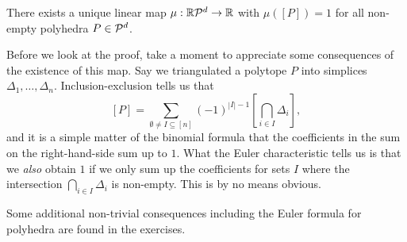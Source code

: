 \begin{lemma}
  \label{lemma:euler-characteristic}
  There exists a unique linear map $\mu: \mathbb{R}\mathcal{P}^d \to \mathbb{R}$
  with $\mu([P]) = 1$ for all non-empty polyhedra $P \in \mathcal{P}^d$.
\end{lemma}

Before we look at the proof,
take a moment to appreciate some consequences of the existence of this map.
Say we triangulated a polytope $P$ into simplices $\Delta_1, \ldots, \Delta_n$.
Inclusion-exclusion tells us that
\[
  [P] = \sum_{\emptyset \neq I \subseteq [n]} (-1)^{|I| - 1} [\bigcap_{i \in I} \Delta_i],
\]
and it is a simple matter of the binomial formula that the coefficients in the sum on the right-hand-side sum up to $1$.
What the Euler characteristic tells us is that we \emph{also} obtain $1$
if we only sum up the coefficients for sets $I$
where the intersection $\bigcap_{i \in I} \Delta_i$ is non-empty.
This is by no means obvious.

Some additional non-trivial consequences
including the Euler formula for polyhedra
are found in the exercises.

